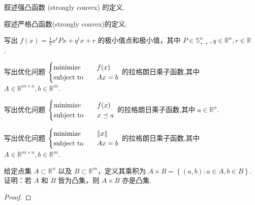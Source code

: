 \begin{problem}[问答]
    叙述强凸函数 (strongly convex) 的定义.
    \Answer 
\end{problem}

\begin{problem}[问答]
    叙述严格凸函数(strongly convex)的定义.
    \Answer 
\end{problem}

\begin{problem}[问答]
    写出 $f(x) = \frac{1}{2}x^tPx + q^tx + r$ 的极小值点和极小值，其中 $P \in \mathbb{S}_{++}^n, q \in \mathbb{R}^n, r \in \mathbb{R}$.
    \Answer 
\end{problem}

\begin{problem}[问答]
    写出优化问题 $\begin{cases}
        \operatorname{minimize} \quad &f(x)\\
        \operatorname{subject\ to} \quad &Ax = b
    \end{cases}$ 的拉格朗日乘子函数,其中 $A \in \mathbb{R}^{m \times n}, b \in \mathbb{R}^m$.
    \Answer 
\end{problem}

\begin{problem}[问答]
    写出优化问题 $\begin{cases}
        \operatorname{minimize} \quad &f(x)\\
        \operatorname{subject\ to} \quad &x \preceq a
    \end{cases}$ 的拉格朗日乘子函数,其中 $a \in \mathbb{R}^n$.
    \Answer 
\end{problem}

\begin{problem}[问答]
    写出优化问题 $\begin{cases}
        \operatorname{minimize} \quad &\|x\| \\
        \operatorname{subject\ to} \quad &Ax = b
    \end{cases}$ 的拉格朗日乘子函数,其中 $A \in \mathbb{R}^{m \times n}, b \in \mathbb{R}^m$.
    \Answer 
\end{problem}

\begin{problem}[问答]
    给定点集 $A\subset \mathbb{R}^n$ 以及 $B \subset \mathbb{R}^m$，定义其乘积为 $A \times B = \left\{(a, b): a \in A, b \in B\right\}$.证明：若 $A$ 和 $B$ 皆为凸集，则 $A \times B$ 亦是凸集.
    \begin{proof}
        
    \end{proof}
\end{problem}

